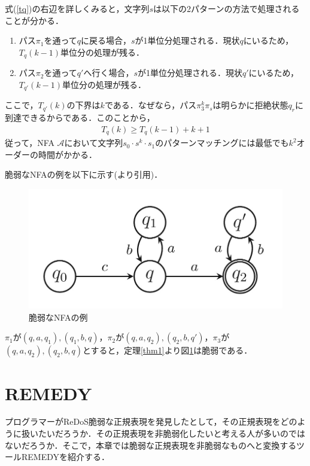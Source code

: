 \documentclass[a4paper, 12pt, dvipdfmx, uplatex]{jsreport}
\begin{document}
式(\ref{tq})の右辺を詳しくみると，文字列$s$は以下の2パターンの方法で処理されることが分かる．
\begin{enumerate}
  \item パス$\pi_1$を通って$q$に戻る場合，$s$が1単位分処理される．現状$q$にいるため，$T_q(k-1)$単位分の処理が残る．
  \item パス$\pi_2$を通って$q'$へ行く場合，$s$が1単位分処理される．現状$q'$にいるため，$T_{q'}(k-1)$単位分の処理が残る．
\end{enumerate}

ここで，$T_{q'}(k)$の下界は$k$である．なぜなら，パス$\pi_3^k \pi_s$は明らかに拒絶状態$q_r$に到達できるからである．このことから，
\begin{align*}
  T_q(k)\geq T_q(k-1)+k+1
\end{align*}
従って，NFA $\mathcal{A}$において文字列$s_0\cdot s^k\cdot s_1$のパターンマッチングには最低でも$k^2$オーダーの時間がかかる．

脆弱なNFAの例を以下に示す(\cite{vul_detect}より引用)．
\begin{figure}[H] %
  \centering
  \includegraphics[width=0.75\linewidth]{../figures/vul_ex.jpg}
  \caption{脆弱なNFAの例\label{vul_ex}}
\end{figure}

$\pi_1$が$(q,a,q_1),(q_1,b,q)$，$\pi_2$が$(q,a,q_2),(q_2,b,q')$，$\pi_3$が$(q,a,q_2),(q_2,b,q)$とすると，定理\ref{thm1}より図\ref{vul_ex}は脆弱である．




\section{REMEDY}
プログラマーがReDoS脆弱な正規表現を発見したとして，その正規表現をどのように扱いたいだろうか．その正規表現を非脆弱化したいと考える人が多いのではないだろうか．そこで，本章では脆弱な正規表現を非脆弱なものへと変換するツールREMEDY\cite{remedy}を紹介する．
\end{document}
